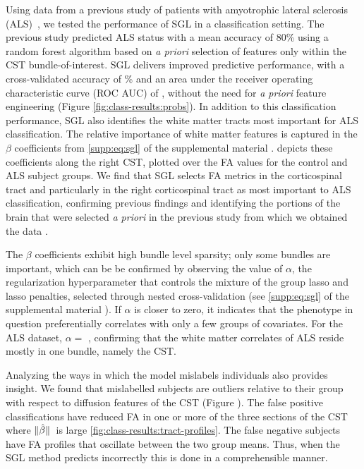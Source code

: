 \documentclass[10pt,%
               aps,%
               prl,%
               preprint,%
               superscriptaddress,%
               preprintnumbers,%
               amsmath,%
               floatfix,%
               endfloats*]{revtex4-1}
\begin{document}
Using data from a previous study of patients with amyotrophic lateral sclerosis (ALS)~\cite{sarica2017corticospinal}, we tested the performance of SGL in a
classification setting. The previous study predicted ALS status with a mean
accuracy of 80\% using a random forest algorithm based on \emph{a priori}
selection of features only within the CST bundle-of-interest.
SGL delivers improved predictive performance, with a cross-validated accuracy of {\alsAccuracy}\% and an area under the receiver operating characteristic curve (ROC AUC) of {\alsRocAuc}, without the need for \emph{a priori} feature engineering (Figure \cref{fig:class-results:probs}). In addition to this
classification performance, SGL also identifies the white matter tracts most
important for ALS classification. The relative importance of white matter
features is captured in the $\beta$ coefficients from \cref{supp:eq:sgl} of
the supplemental material \cite{supplement}.
 depicts these coefficients along the
right CST, plotted over the FA values for the control and ALS subject groups.
We find that SGL selects FA metrics in the corticospinal tract and
particularly in the right corticospinal tract as most important to ALS
classification, confirming previous findings \cite{van2011upper,
toosy2003diffusion, sarica2014tractography, sage2007quantitative,
sage2009quantitative, karlsborg2004corticospinal, ellis1999diffusion,
cosottini2005diffusion, ciccarelli2009investigation, abe2010voxel} and
identifying the portions of the brain that were selected \emph{a priori} in
the previous study from which we obtained the data
\cite{sarica2017corticospinal}.

The $\beta$ coefficients exhibit high bundle level sparsity; only some
bundles are important, which can be be confirmed by observing the value of
$\alpha$, the regularization hyperparameter that controls the mixture of the
group lasso and lasso penalties, selected through nested cross-validation
(see \cref{supp:eq:sgl} of the supplemental material \cite{supplement}).
If $\alpha$ is closer to zero, it indicates that the phenotype in question
preferentially correlates with only a few groups of covariates. For the ALS
dataset, $\alpha = $ \alsLRatio, confirming that the white matter correlates
of ALS reside mostly in one bundle, namely the CST.

Analyzing the ways in which the model mislabels individuals also provides
insight. We found that mislabelled subjects are outliers relative to their
group with respect to diffusion features of the CST (Figure
).
The false positive classifications have reduced FA in one or more of the three
sections of the CST where $\norm*{\hat{\beta}}$ is large
\cref{fig:class-results:tract-profiles}. The false negative subjects have FA
profiles that oscillate between the two group means. Thus, when the SGL
method predicts incorrectly this is done in a comprehensible manner.
\end{document}
